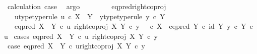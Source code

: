 \begin{isabellebody}
\ calculation\ case{}\ \isamarkupfalse%
\ argo\isanewline
\ \ \ \ \isamarkupfalse%
\isanewline
\ \ \isamarkupfalse%
\isanewline
{}\isamarkupfalse%
%
\endisatagproof
{\isafoldproof}%
%
\isadelimproof
\isanewline
%
\endisadelimproof
\isanewline
{}\isamarkupfalse%
\ eq{\isacharunderscore}{\kern0pt}pred{\isacharunderscore}{\kern0pt}right{\isacharunderscore}{\kern0pt}coproj{\isacharcolon}{\kern0pt}\isanewline
\ \ \ u{\isacharunderscore}{\kern0pt}type{\isacharbrackleft}{\kern0pt}type{\isacharunderscore}{\kern0pt}rule{\isacharbrackright}{\kern0pt}{\isacharcolon}{\kern0pt}\ {\isachardoublequoteopen}u\ {\isasymin}\isactrlsub c\ X\ {\isasymCoprod}\ Y{\isachardoublequoteclose}\ \ y{\isacharunderscore}{\kern0pt}type{\isacharbrackleft}{\kern0pt}type{\isacharunderscore}{\kern0pt}rule{\isacharbrackright}{\kern0pt}{\isacharcolon}{\kern0pt}\ {\isachardoublequoteopen}y\ {\isasymin}\isactrlsub c\ Y{\isachardoublequoteclose}\isanewline
\ \ \ {\isachardoublequoteopen}eq{\isacharunderscore}{\kern0pt}pred\ {\isacharparenleft}{\kern0pt}X\ {\isasymCoprod}\ Y{\isacharparenright}{\kern0pt}\ {\isasymcirc}\isactrlsub c\ {\isasymlangle}u{\isacharcomma}{\kern0pt}\ right{\isacharunderscore}{\kern0pt}coproj\ X\ Y\ {\isasymcirc}\isactrlsub c\ y{\isasymrangle}\ {\isacharequal}{\kern0pt}\ {\isacharparenleft}{\kern0pt}{\isacharparenleft}{\kern0pt}{\isasymf}\ {\isasymcirc}\isactrlsub c\ {\isasymbeta}\isactrlbsub X\isactrlesub {\isacharparenright}{\kern0pt}\ {\isasymamalg}\ {\isacharparenleft}{\kern0pt}eq{\isacharunderscore}{\kern0pt}pred\ Y\ {\isasymcirc}\isactrlsub c\ {\isasymlangle}id\ Y{\isacharcomma}{\kern0pt}\ y\ {\isasymcirc}\isactrlsub c\ {\isasymbeta}\isactrlbsub Y\isactrlesub {\isasymrangle}{\isacharparenright}{\kern0pt}{\isacharparenright}{\kern0pt}\ {\isasymcirc}\isactrlsub c\ u{\isachardoublequoteclose}\isanewline
%
\isadelimproof
%
\endisadelimproof
%
\isatagproof
{}\isamarkupfalse%
\ {\isacharparenleft}{\kern0pt}cases\ {\isachardoublequoteopen}eq{\isacharunderscore}{\kern0pt}pred\ {\isacharparenleft}{\kern0pt}X\ {\isasymCoprod}\ Y{\isacharparenright}{\kern0pt}\ {\isasymcirc}\isactrlsub c\ {\isasymlangle}u{\isacharcomma}{\kern0pt}\ right{\isacharunderscore}{\kern0pt}coproj\ X\ Y\ {\isasymcirc}\isactrlsub c\ y{\isasymrangle}\ {\isacharequal}{\kern0pt}\ {\isasymt}{\isachardoublequoteclose}{\isacharparenright}{\kern0pt}\isanewline
\ \ \isamarkupfalse%
\ case{}{\isacharcolon}{\kern0pt}\ {\isachardoublequoteopen}eq{\isacharunderscore}{\kern0pt}pred\ {\isacharparenleft}{\kern0pt}X\ {\isasymCoprod}\ Y{\isacharparenright}{\kern0pt}\ {\isasymcirc}\isactrlsub c\ {\isasymlangle}u{\isacharcomma}{\kern0pt}right{\isacharunderscore}{\kern0pt}coproj\ X\ Y\ {\isasymcirc}\isactrlsub c\ y{\isasymrangle}\ {\isacharequal}{\kern0pt}\ {\isasymt}{\isachardoublequoteclose}\isanewline

\end{isabellebody}
